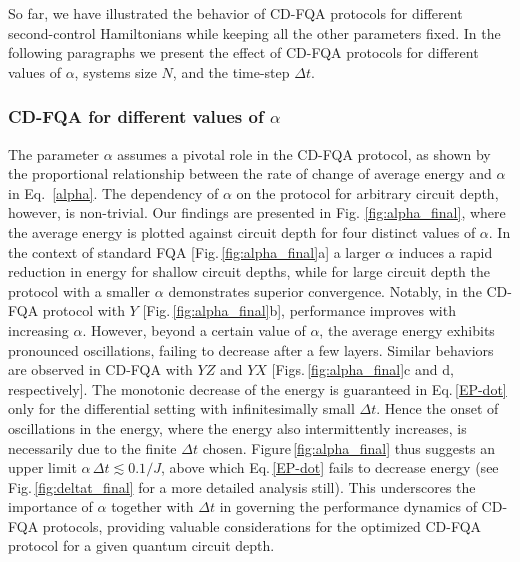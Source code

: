 \documentclass[twocolumn,aps,superscriptaddress,floatfix,longbibliography]{revtex4-2}
\newcommand{\Eq}[1]{Eq.\,\eqref{#1}}
\newcommand{\FIG}[1]{Figure\,\ref{fig:#1}}
\newcommand{\Fig}[1]{Fig.\,\ref{fig:#1}}
\newcommand{\Figs}[1]{Figs.\,\ref{fig:#1}}
\begin{document}
So far, we have illustrated the behavior of CD-FQA protocols for different second-control Hamiltonians while keeping all the other parameters fixed. In the following paragraphs we present the effect of CD-FQA protocols for different values of $\alpha$, systems size $N$, and the time-step $\Delta t$.

\subsubsection{CD-FQA for different values of $\alpha$}
The parameter $\alpha$ assumes a pivotal role in the CD-FQA protocol, as shown by the proportional relationship between the rate of change of average energy and $\alpha$ in Eq.~\ref{alpha}. The dependency of $\alpha$ on the protocol for arbitrary circuit depth, however, is non-trivial. Our findings are presented in Fig. \ref{fig:alpha_final}, where the average energy is plotted against circuit depth for four distinct values of $\alpha$.
In the context of standard FQA
[\Fig{alpha_final}a] %
a larger $\alpha$ induces a rapid reduction in energy for shallow circuit depths, while for large circuit depth the protocol with a smaller $\alpha$ demonstrates superior convergence. Notably, in the CD-FQA protocol with $Y$
[\Fig{alpha_final}b],
performance improves with increasing $\alpha$. However, beyond a certain value %
of $\alpha$, the average energy exhibits pronounced oscillations, failing to decrease after a few layers. 
Similar behaviors are observed in CD-FQA with $YZ$ and $YX$
[\Figs{alpha_final}c and d, respectively].
The monotonic decrease of the energy
is guaranteed in \Eq{EP-dot} only for the differential
setting with infinitesimally small $\Delta t$.
Hence the onset of oscillations in the energy, where
the energy also intermittently increases, is necessarily
due to the finite $\Delta t$ chosen.
\FIG{alpha_final} thus suggests an upper limit
$\alpha \, \Delta t \lesssim 0.1/J$, above which
\Eq{EP-dot} fails to decrease energy (see \Fig{deltat_final}
for a more detailed analysis still). This
underscores the importance of $\alpha$ 
together with $\Delta t$
in governing the performance dynamics of CD-FQA protocols, providing valuable considerations for the optimized CD-FQA protocol for a given quantum circuit depth.
\end{document}
